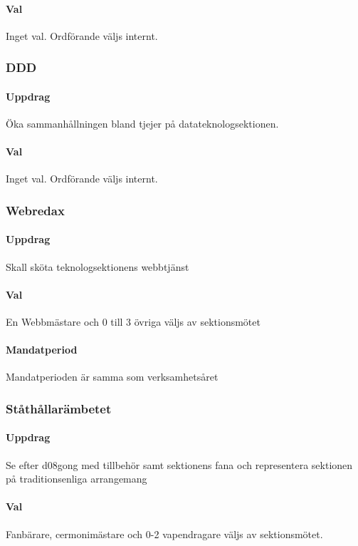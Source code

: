 \documentclass[a4paper, 10pt]{article}
\begin{document}
\paragraph{Val\\}
Inget val. Ordförande väljs internt. 
\subsubsection{DDD}
\paragraph{Uppdrag\\}
Öka sammanhållningen bland tjejer på datateknologsektionen. 
\paragraph{Val\\}
Inget val. Ordförande väljs internt.
\subsubsection{Webredax}
\paragraph{Uppdrag\\}
Skall sköta teknologsektionens webbtjänst
\paragraph{Val\\}
En Webbmästare och 0 till 3 övriga väljs av sektionsmötet
\paragraph{Mandatperiod\\}
Mandatperioden är samma som verksamhetsåret
\subsubsection{Ståthållarämbetet}
\paragraph{Uppdrag\\}
Se efter d08gong med tillbehör samt sektionens fana och representera sektionen på traditionsenliga arrangemang
\paragraph{Val\\}
Fanbärare, cermonimästare och 0-2 vapendragare väljs av sektionsmötet.
\end{document}
